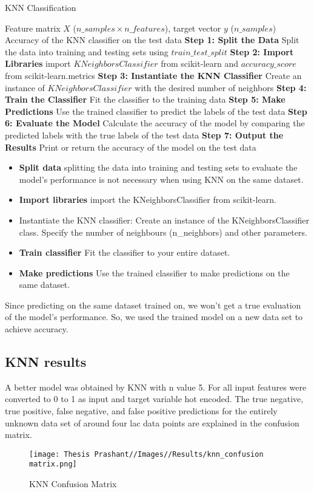 \begin{algorithm}
\caption{KNN Classification}\label{alg:knn_classification}
\begin{algorithmic}
\REQUIRE Feature matrix $X$ ($n\_samples \times n\_features$), target vector $y$ ($n\_samples$)
\ENSURE Accuracy of the KNN classifier on the test data
\STATE \textbf{Step 1: Split the Data}
    \STATE Split the data into training and testing sets using $train\_test\_split$
\STATE \textbf{Step 2: Import Libraries} import $KNeighborsClassifier$ from scikit-learn and $accuracy\_score$ from scikit-learn.metrics
\STATE \textbf{Step 3: Instantiate the KNN Classifier}
    \STATE Create an instance of $KNeighborsClassifier$ with the desired number of neighbors
\STATE \textbf{Step 4: Train the Classifier}
    \STATE Fit the classifier to the training data
\STATE \textbf{Step 5: Make Predictions}
    \STATE Use the trained classifier to predict the labels of the test data
\STATE \textbf{Step 6: Evaluate the Model}
    \STATE Calculate the accuracy of the model by comparing the predicted labels with the true labels of the test data
\STATE \textbf{Step 7: Output the Results}
    \STATE Print or return the accuracy of the model on the test data
\end{algorithmic}
\end{algorithm}
\begin{itemize}
    \item \textbf{Split data }splitting the data into training and testing sets to evaluate the model's performance is not necessary when using KNN on the same dataset.
    \item \textbf{Import libraries} import the KNeighborsClassifier from scikit-learn.
    \item Instantiate the KNN classifier: Create an instance of the KNeighborsClassifier class. Specify the number of neighbours (n\_neighbors) and other parameters.
    \item \textbf{Train classifier} Fit the classifier to your entire dataset.
    \item \textbf{Make predictions} Use the trained classifier to make predictions on the same dataset.
\end{itemize}
Since predicting on the same dataset trained on, we won't get a true evaluation of the model's performance. So, we used the trained model on a new data set to achieve accuracy.

\subsection{KNN results}
A better model was obtained by KNN with n value 5. For all input features were converted to 0 to 1 as input and target variable hot encoded. The true negative, true positive, false negative, and false positive predictions for the entirely unknown data set of around four lac data points are explained in the confusion matrix.
\begin{figure}
    \centering
    \texttt{[image: Thesis Prashant//Images//Results/knn\_confusion matrix.png]}
    \caption{KNN Confusion Matrix}
    \label{fig:enter-label}
\end{figure}


